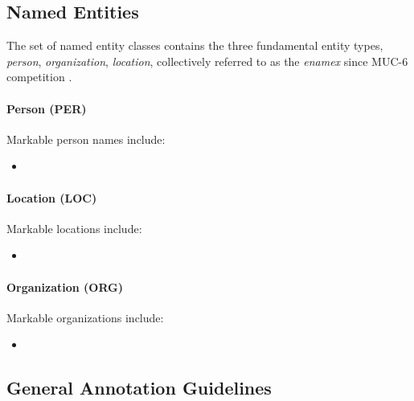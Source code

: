 \documentclass[11pt]{article}
\begin{document}
\subsection{Named Entities}
\label{sec: named entities}

The set of named entity classes contains the three fundamental entity types, \textit{person}, \textit{organization}, \textit{location}, collectively referred to as the \textit{enamex} since MUC-6 competition \citep{grishman1996}. 




\paragraph{Person (PER)}

Markable person names include:

\begin{itemize}

\item[]

\end{itemize}


\paragraph{Location (LOC)}

Markable locations include:

\begin{itemize}

\item[]

\end{itemize}


\paragraph{Organization (ORG)}

Markable organizations include:

\begin{itemize}

\item[]

\end{itemize}


\subsection{General Annotation Guidelines}
\end{document}
